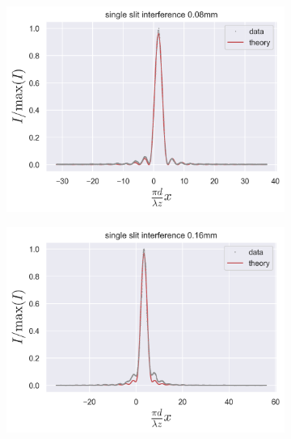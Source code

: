 \begin{figure}[H]
	\centering
	\begin{subfigure}{0.5\columnwidth}
		\centering
		\includegraphics[width=\columnwidth]{figures/single slit interference 0.08mm.png} %
		\caption{}
        \label{fig:single slit interference 0.08mm}
	\end{subfigure}\hfill
    \begin{subfigure}{0.5\columnwidth}
        \centering
        \includegraphics[width=\columnwidth]{figures/single slit interference 0.16mm.png} %
        \caption{}
        \label{fig:single slit interference 0.16mm}
    \end{subfigure}
    \begin{subfigure}{0.48\columnwidth}

\end{subfigure}
\end{figure}
